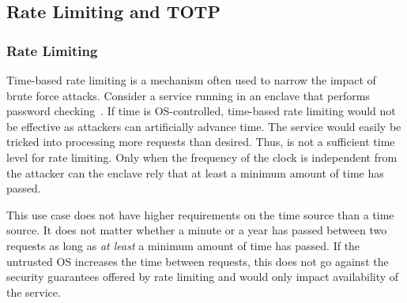 \documentclass[sigplan,10pt]{acmart}
\begin{document}
\subsection{Rate Limiting and TOTP}

\subsubsection*{Rate Limiting}
%
Time-based rate limiting is a mechanism often used to narrow the impact of brute
force attacks. Consider a service running in an enclave that performs password
checking~\cite{krawiecka2018safekeeper}. If time is OS-controlled, time-based
rate limiting would not be effective as attackers can artificially advance time. The service would easily be tricked into processing more
requests than desired. Thus, \Tone{} is not a sufficient time level
for rate limiting. Only when the frequency of the clock is independent from the
attacker can the enclave rely that at least a minimum amount of time has passed.

This use case does not have higher requirements on the time
source than a \Ttwo time source. It does not matter
whether a minute or a year has passed between two requests as long as \textit{at
least} a minimum amount of time has passed. If the
untrusted OS increases the time between requests, this does not go against the
security guarantees offered by rate limiting and would only impact
availability of the service.

\end{document}
